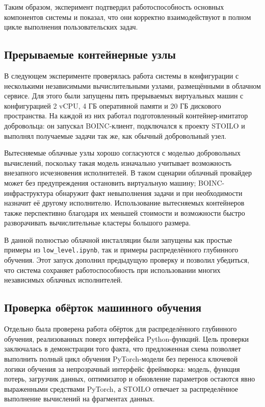 \documentclass[a4paper,12pt]{extarticle}
\begin{document}
Таким образом, эксперимент подтвердил работоспособность основных компонентов системы и показал, что они корректно взаимодействуют в полном цикле выполнения пользовательских задач.

\subsection{Прерываемые контейнерные узлы}
\label{subsec:preemptible}

В следующем эксперименте проверялась работа системы в конфигурации с несколькими независимыми вычислительными узлами, размещёнными в облачном сервисе.
Для этого были запущены пять прерываемых виртуальных машин с конфигурацией 2 vCPU, 4 ГБ оперативной памяти и 20 ГБ дискового пространства.
На каждой из них работал подготовленный контейнер-имитатор добровольца: он запускал BOINC-клиент, подключался к проекту STOILO и выполнял получаемые задачи так же, как обычный добровольный узел.

Вытесняемые облачные узлы хорошо согласуются с моделью добровольных вычислений, поскольку такая модель изначально учитывает возможность внезапного исчезновения исполнителей.
В таком сценарии облачный провайдер может без предупреждения остановить виртуальную машину; BOINC-инфраструктура обнаружит факт невыполнения задачи и при необходимости назначит её другому исполнителю.
Использование вытесняемых контейнеров также перспективно благодаря их меньшей стоимости и возможности быстро разворачивать вычислительные кластеры большого размера.

В данной полностью облачной инсталляции были запущены как простые примеры из \texttt{low\_level.ipynb}, так и примеры распределённого глубинного обучения. Этот запуск дополнил предыдущую проверку и позволил убедиться, что система сохраняет работоспособность при использовании многих независимых облачных исполнителей.

\subsection{Проверка обёрток машинного обучения}

Отдельно была проверена работа обёрток для распределённого глубинного обучения, реализованных поверх интерфейса Python-функций.
Цель проверки заключалась в демонстрации того факта, что предложенная схема позволяет выполнить полный цикл обучения PyTorch-модели без переноса ключевой логики обучения за непрозрачный интерфейс фреймворка: модель, функция потерь, загрузчик данных, оптимизатор и обновление параметров остаются явно выраженными средствами PyTorch, а STOILO отвечает за распределённое выполнение вычислений на фрагментах данных.
\end{document}
